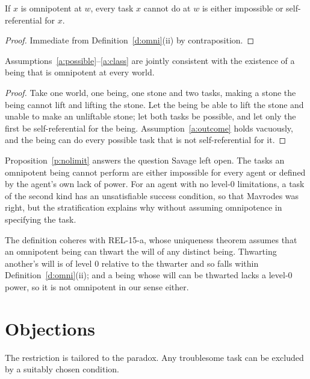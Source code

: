 \documentclass{situationist-preprint}
\begin{document}
\begin{proposition}\label{p:nolimit}
If $x$ is omnipotent at $w$, every task $x$ cannot do at $w$ is either impossible or self-referential for $x$.
\end{proposition}

\begin{proof}
Immediate from Definition~\ref{d:omni}(ii) by contraposition.
\end{proof}

\begin{proposition}\label{p:consistent}
Assumptions~\ref{a:possible}--\ref{a:class} are jointly consistent with the existence of a being that is omnipotent at every world.
\end{proposition}

\begin{proof}
Take one world, one being, one stone and two tasks, making a stone the being cannot lift and lifting the stone. Let the being be able to lift the stone and unable to make an unliftable stone; let both tasks be possible, and let only the first be self-referential for the being. Assumption~\ref{a:outcome} holds vacuously, and the being can do every possible task that is not self-referential for it.
\end{proof}

Proposition~\ref{p:nolimit} answers the question Savage left open. The tasks an omnipotent being cannot perform are either impossible for every agent or defined by the agent's own lack of power. For an agent with no level-$0$ limitations, a task of the second kind has an unsatisfiable success condition, so that Mavrodes was right, but the stratification explains why without assuming omnipotence in specifying the task.

The definition coheres with REL-15-a, whose uniqueness theorem assumes that an omnipotent being can thwart the will of any distinct being. Thwarting another's will is of level $0$ relative to the thwarter and so falls within Definition~\ref{d:omni}(ii); and a being whose will can be thwarted lacks a level-$0$ power, so it is not omnipotent in our sense either.

\section{Objections}

\begin{objection}
The restriction is tailored to the paradox. Any troublesome task can be excluded by a suitably chosen condition.
\end{objection}
\end{document}
